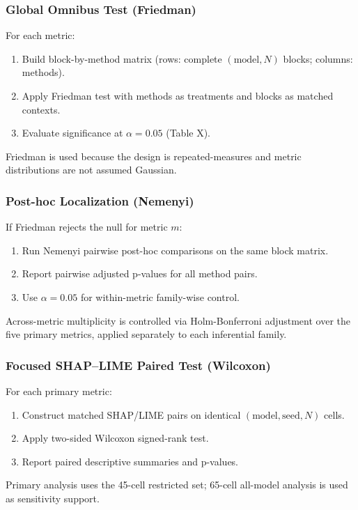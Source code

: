 \documentclass[twoside,11pt]{article}
\begin{document}
\subsubsection{Global Omnibus Test (Friedman)}
For each metric:
\begin{enumerate}[leftmargin=*]
    \item Build block-by-method matrix (rows: complete $(\text{model},N)$ blocks;
    columns: methods).
    \item Apply Friedman test with methods as treatments and blocks as matched contexts.
    \item Evaluate significance at $\alpha=0.05$ (Table X).
\end{enumerate}
Friedman is used because the design is repeated-measures and metric
distributions are not assumed Gaussian.

\subsubsection{Post-hoc Localization (Nemenyi)}
If Friedman rejects the null for metric $m$:
\begin{enumerate}[leftmargin=*]
    \item Run Nemenyi pairwise post-hoc comparisons on the same block matrix.
    \item Report pairwise adjusted p-values for all method pairs.
    \item Use $\alpha=0.05$ for within-metric family-wise control.
\end{enumerate}
Across-metric multiplicity is controlled via Holm-Bonferroni adjustment over the
five primary metrics, applied separately to each inferential family.

\subsubsection{Focused SHAP--LIME Paired Test (Wilcoxon)}
For each primary metric:
\begin{enumerate}[leftmargin=*]
    \item Construct matched SHAP/LIME pairs on identical $(\text{model},\text{seed},N)$ cells.
    \item Apply two-sided Wilcoxon signed-rank test.
    \item Report paired descriptive summaries and p-values.
\end{enumerate}
Primary analysis uses the 45-cell restricted set; 65-cell all-model analysis is
used as sensitivity support.
\end{document}
